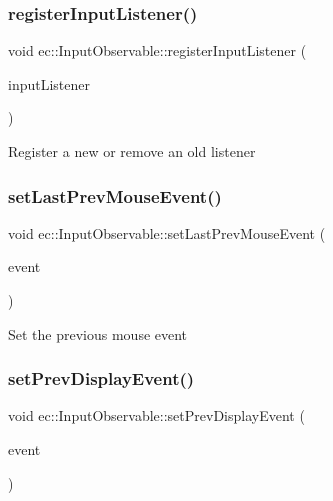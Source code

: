 \mbox{\label{classec_1_1_input_observable_a542bd14ecfbeceed917ea0df5c7f3755}} 
\subsubsection{\texorpdfstring{register\+Input\+Listener()}{registerInputListener()}}
{\footnotesize\ttfamily void ec\+::\+Input\+Observable\+::register\+Input\+Listener (\begin{DoxyParamCaption}\item[{\mbox{\hyperlink{classec_1_1_input_listener}{Input\+Listener}} $\ast$}]{input\+Listener }\end{DoxyParamCaption})\hspace{0.3cm}{\ttfamily [virtual]}}

Register a new or remove an old listener \mbox{\label{classec_1_1_input_observable_abcd9d6067210ea7751824b619147a65c}} 
\subsubsection{\texorpdfstring{set\+Last\+Prev\+Mouse\+Event()}{setLastPrevMouseEvent()}}
{\footnotesize\ttfamily void ec\+::\+Input\+Observable\+::set\+Last\+Prev\+Mouse\+Event (\begin{DoxyParamCaption}\item[{const \mbox{\hyperlink{structec_1_1_mouse_event}{Mouse\+Event}} \&}]{event }\end{DoxyParamCaption})}

Set the previous mouse event \mbox{\label{classec_1_1_input_observable_a55c7310a50dc873f69c2246bbeeed3e6}} 
\subsubsection{\texorpdfstring{set\+Prev\+Display\+Event()}{setPrevDisplayEvent()}}
{\footnotesize\ttfamily void ec\+::\+Input\+Observable\+::set\+Prev\+Display\+Event (\begin{DoxyParamCaption}\item[{const \mbox{\hyperlink{structec_1_1_display_event}{Display\+Event}} \&}]{event }\end{DoxyParamCaption})}

